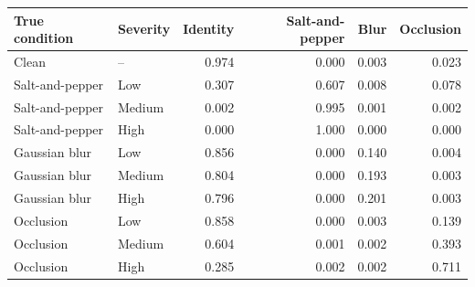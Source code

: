 \begin{tabular}{llrrrr}
\toprule
True condition & Severity & Identity & Salt-and-pepper & Blur & Occlusion \\
\midrule
Clean & -- & 0.974 & 0.000 & 0.003 & 0.023 \\
\midrule
Salt-and-pepper & Low & 0.307 & 0.607 & 0.008 & 0.078 \\
Salt-and-pepper & Medium & 0.002 & 0.995 & 0.001 & 0.002 \\
Salt-and-pepper & High & 0.000 & 1.000 & 0.000 & 0.000 \\
\midrule
Gaussian blur & Low & 0.856 & 0.000 & 0.140 & 0.004 \\
Gaussian blur & Medium & 0.804 & 0.000 & 0.193 & 0.003 \\
Gaussian blur & High & 0.796 & 0.000 & 0.201 & 0.003 \\
\midrule
Occlusion & Low & 0.858 & 0.000 & 0.003 & 0.139 \\
Occlusion & Medium & 0.604 & 0.001 & 0.002 & 0.393 \\
Occlusion & High & 0.285 & 0.002 & 0.002 & 0.711 \\
\bottomrule
\end{tabular}

